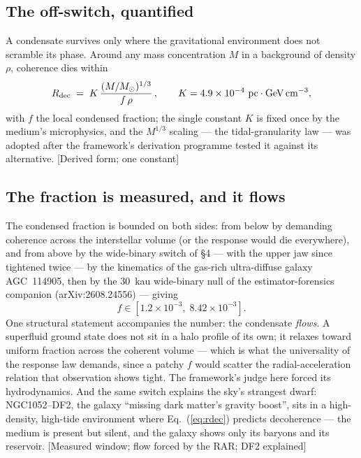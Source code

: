 \subsection{The off-switch, quantified}
A condensate survives only where the gravitational environment does not scramble its phase. Around any mass concentration $M$ in a background of density $\rho$, coherence dies within
\begin{equation}
R_{\rm dec}\;=\;K\,\frac{(M/M_{\odot})^{1/3}}{f\,\rho}\,,\qquad K=4.9\times10^{-4}~\mathrm{pc\cdot GeV\,cm^{-3}},
\label{eq:rdec}
\end{equation}
with $f$ the local condensed fraction; the single constant $K$ is fixed once by the medium's microphysics, and the $M^{1/3}$ scaling --- the tidal-granularity law --- was adopted after the framework's derivation programme tested it against its alternative. [Derived form; one constant]
\subsection{The fraction is measured, and it flows}
The condensed fraction is bounded on both sides: from below by demanding coherence across the interstellar volume (or the response would die everywhere), and from above by the wide-binary switch of \S4 --- with the upper jaw since tightened twice --- by the kinematics of the gas-rich ultra-diffuse galaxy AGC~114905, then by the 30~kau wide-binary null of the estimator-forensics companion (arXiv:2608.24556) --- giving
\begin{equation}
f\in[1.2\times10^{-3},\;8.42\times10^{-3}] .
\end{equation}
One structural statement accompanies the number: the condensate \emph{flows}. A superfluid ground state does not sit in a halo profile of its own; it relaxes toward uniform fraction across the coherent volume --- which is what the universality of the response law demands, since a patchy $f$ would scatter the radial-acceleration relation that observation shows tight. The framework's judge here forced its hydrodynamics. And the same switch explains the sky's strangest dwarf: NGC1052--DF2, the galaxy ``missing dark matter's gravity boost'', sits in a high-density, high-tide environment where Eq.~(\ref{eq:rdec}) predicts decoherence --- the medium is present but silent, and the galaxy shows only its baryons and its reservoir. [Measured window; flow forced by the RAR; DF2 explained]

